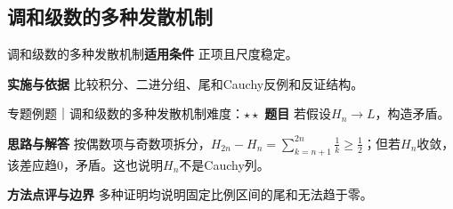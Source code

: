 \subsection{调和级数的多种发散机制}\label{mat:series_methods:harmonic}
\begin{method}{调和级数的多种发散机制}\textbf{适用条件} 正项且尺度稳定。\par\textbf{实施与依据} 比较积分、二进分组、尾和Cauchy反例和反证结构。\end{method}
\begin{example}{专题例题｜调和级数的多种发散机制}{难度：$\star\star$}
\textbf{题目} 若假设$H_n\to L$，构造矛盾。\par\textbf{思路与解答} 按偶数项与奇数项拆分，$H_{2n}-H_n=\sum_{k=n+1}^{2n}\frac{1}{k}\ge\frac{1}{2}$；但若$H_n$收敛，该差应趋0，矛盾。这也说明$H_n$不是Cauchy列。\par\textbf{方法点评与边界} 多种证明均说明固定比例区间的尾和无法趋于零。
\end{example}
